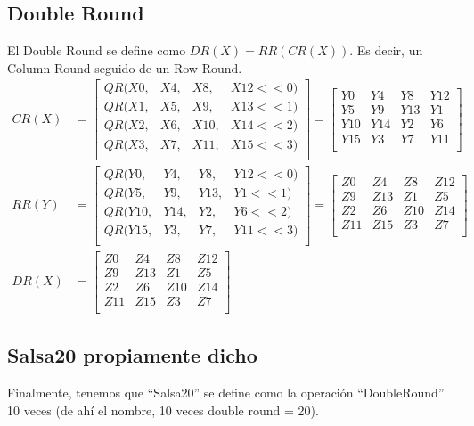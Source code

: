 \documentclass[12pt,a4paper]{report}
\begin{document}
\subsection{Double Round}
El Double Round se define como $DR(X) = RR(CR(X))$. Es decir, un Column Round seguido de un Row Round.
$$
\begin{aligned}
CR(X) &= \begin{bmatrix}
QR(X0, & X4, & X8, & X12 << 0)\\
QR(X1, & X5, & X9, & X13 << 1)\\
QR(X2, & X6, & X10, & X14 << 2)\\
QR(X3, & X7, & X11, & X15 << 3)\\
\end{bmatrix} =
\begin{bmatrix}
Y0  & Y4  & Y8  & Y12 \\
Y5  & Y9  & Y13  & Y1  \\
Y10 & Y14 & Y2  & Y6 \\
Y15 & Y3 & Y7 & Y11 \\
\end{bmatrix} \\
RR(Y) &= \begin{bmatrix}
QR(Y0, & Y4, & Y8,  & Y12 << 0)\\
QR(Y5, & Y9, & Y13, & Y1<< 1)\\
QR(Y10, & Y14, & Y2, & Y6 << 2)\\
QR(Y15, & Y3, & Y7, & Y11 << 3)\\
\end{bmatrix} =
\begin{bmatrix}
Z0  & Z4  & Z8  & Z12 \\
Z9  & Z13  & Z1 & Z5 \\
Z2  & Z6  & Z10 & Z14 \\
Z11 & Z15 & Z3  & Z7  \\
\end{bmatrix}\\
DR(X) &= 
\begin{bmatrix}
Z0  & Z4  & Z8  & Z12 \\
Z9  & Z13  & Z1 & Z5 \\
Z2  & Z6  & Z10 & Z14 \\
Z11 & Z15 & Z3  & Z7  \\
\end{bmatrix}
\end{aligned}
$$

\subsection{Salsa20 propiamente dicho}
Finalmente, tenemos que ``Salsa20'' se define como la operación ``DoubleRound'' 10 veces (de ahí el nombre, 10 veces double round = 20).
\end{document}
